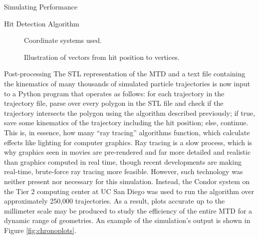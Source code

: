 \begin{section}{Simulating Performance}
\begin{subsection}{Hit Detection Algorithm}
\begin{figure}[htb]
\begin{center}

\subfloat[Original]      {

}\quad
\subfloat[Primed]      {

}

\end{center}
\caption{Coordinate systems used.}
\label{fig:setup}
\end{figure}

\begin{figure}[htb]
\begin{center}

\subfloat[Inside]      {

}\quad
\subfloat[Outside]      {

}

\end{center}
\caption{Illustration of vectors from hit position to vertices.}
\label{fig:vectors}
\end{figure}

\end{subsection}
\begin{subsection}{Post-processing}
The STL representation of the MTD and a text file containing the kinematics of many thousands of simulated particle trajectories is now input to a Python program that operates as follows: for each trajectory in the trajectory file, parse over every polygon in the STL file and check if the trajectory intersects the polygon using the algorithm described previously; if true, save some kinematics of the trajectory including the hit position; else, continue. This is, in essence, how many ``ray tracing'' algorithms function\cite{raytrace}, which calculate effects like lighting for computer graphics. Ray tracing is a slow process, which is why graphics seen in movies are pre-rendered and far more detailed and realistic than graphics computed in real time, though recent developments are making real-time, brute-force ray tracing more feasible. However, such technology was neither present nor necessary for this simulation. Instead, the Condor\cite{condor} system on the Tier 2 computing center at UC San Diego was used to run the algorithm over approximately 250,000 trajectories. As a result, plots accurate up to the millimeter scale may be produced to study the efficiency of the entire MTD for a dynamic range of geometries. An example of the simulation's output is shown in Figure \ref{fig:chronoplots}.


\end{subsection}
\end{section}
